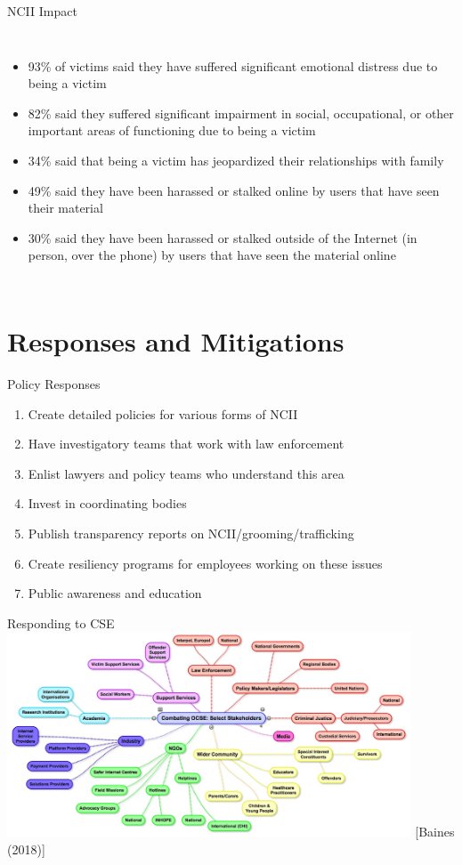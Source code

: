 \documentclass[nobackground,dvipsnames,table,aspectratio=169]{beamer}
\begin{document}
\begin{frame}{NCII Impact}
\begin{columns}
            \begin{itemize}
                \item 93\% of victims said they have suffered significant emotional distress due to being a victim
                \item 82\% said they suffered significant impairment in social, occupational, or other important areas of functioning due to being a victim
                \item 34\% said that being a victim has jeopardized their relationships with family
                \item 49\% said they have been harassed or stalked online by users that have seen their material
                \item 30\% said they have been harassed or stalked outside of the Internet (in person, over the phone) by users that have seen the material online
            \end{itemize}
    \end{columns}
\end{frame}

\section{Responses and Mitigations}

\begin{frame}{Policy Responses}
    \large
    \begin{enumerate}
        \item Create detailed policies for various forms of NCII
        \item Have investigatory teams that work with law enforcement
        \item Enlist lawyers and policy teams who understand this area
        \item Invest in coordinating bodies
        \item Publish transparency reports on NCII/grooming/trafficking
        \item Create resiliency programs for employees working on these issues
        \item Public awareness and education
    \end{enumerate}
\end{frame}

\begin{frame}{Responding to CSE}
    \centering
    \includegraphics[width=0.9\textwidth]{combating-ocse}
    [Baines (2018)]
\end{frame}
\end{document}
